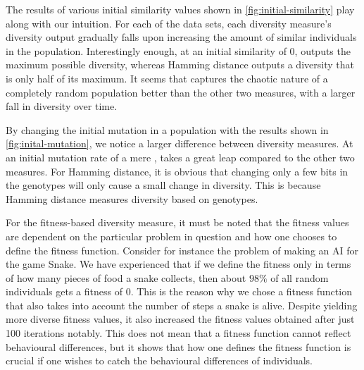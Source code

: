 

The results of various initial similarity values shown in \cref{fig:initial-similarity} play along with our intuition.
For each of the data sets, each diversity measure's diversity output gradually falls upon increasing the amount of similar individuals in the population. Interestingly enough, at an initial similarity of 0, \dia{} outputs the maximum possible diversity, whereas Hamming distance outputs a diversity that is only half of its maximum. It seems that \dia{} captures the chaotic nature of a completely random population better than the other two measures, with a larger fall in diversity over time.



By changing the initial mutation in a population with the results shown in \cref{fig:inital-mutation}, we notice a larger difference between diversity measures. At an initial mutation rate of a mere , \dia{} takes a great leap compared to the other two measures.
For Hamming distance, it is obvious that changing only a few bits in the genotypes will only cause a small change in diversity.
This is because Hamming distance measures diversity based on genotypes.

For the fitness-based diversity measure, it must be noted that the fitness values are dependent on the particular problem in question and how one chooses to define the fitness function.
Consider for instance the problem of making an AI for the game Snake.
We have experienced that if we define the fitness only in terms of how many pieces of food a snake collects,
then about $98 \%$ of all random individuals gets a fitness of $0$.
This is the reason why we chose a fitness function that also takes into account the number of steps a snake is alive.
Despite yielding more diverse fitness values, it also increased the fitness values obtained after just 100 iterations notably.
This does not mean that a fitness function cannot reflect behavioural differences, but it shows that how one defines the fitness function is crucial if one wishes to catch the behavioural differences of individuals.
